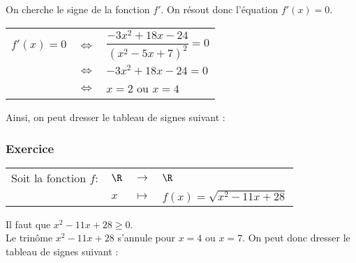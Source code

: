 On cherche le signe de la fonction $f'$. On résout donc l'équation $f'(x) = 0$. \\

\begin{tabular}{rll}
$f'(x) = 0$ & $\Longleftrightarrow$ & $\dfrac{-3x^2 + 18x - 24}{\left(x^2 - 5x +7\right)^2} = 0$ \vspace*{.3cm} \\
& $\Longleftrightarrow$ & $-3x^2 + 18x - 24 = 0$ \vspace*{.3cm} \\
& $\Longleftrightarrow$ & $x = 2$ ou $x = 4$ \\
\end{tabular}

\vspace*{.3cm}

Ainsi, on peut dresser le tableau de signes suivant :  \\


\newpage

\subsubsection{Exercice }

\begin{tabular}{llll}
Soit la fonction $f :$ & $\R$ & $\longrightarrow$ & $\R$ \\
& $x$ & $\longmapsto$ & $f(x) = \sqrt{x^2 - 11x + 28}$ \\
\end{tabular}

\vspace*{.3cm}

Il faut que $x^2 - 11x + 28 \geqslant 0$. \\

Le trinôme $x^2 - 11x + 28$ s'annule pour $x = 4$ ou $x=7$. On peut donc dresser le tableau de signes suivant : \\


